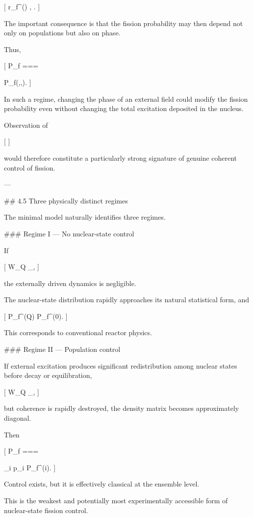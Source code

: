 [
r_f^{()}
,
.
]

The important consequence is that the fission probability may then depend not only on populations but also on phase.

Thus,

[
P_f
===

P_f(\Omega,\Delta,\phi).
]

In such a regime, changing the phase of an external field could modify the fission probability even without changing the total excitation deposited in the nucleus.

Observation of

[
]

would therefore constitute a particularly strong signature of genuine coherent control of fission.

---

## 4.5 Three physically distinct regimes

The minimal model naturally identifies three regimes.

### Regime I — No nuclear-state control

If

[
W_Q
\ll
\Gamma_{},
]

the externally driven dynamics is negligible.

The nuclear-state distribution rapidly approaches its natural statistical form, and

[
P_f^{(Q)}
\simeq
P_f^{(0)}.
]

This corresponds to conventional reactor physics.

### Regime II — Population control

If external excitation produces significant redistribution among nuclear states before decay or equilibration,

[
W_Q
\gtrsim
\Gamma_{},
]

but coherence is rapidly destroyed, the density matrix becomes approximately diagonal.

Then

[
P_f
===

\sum_i p_i P_f^{(i)}.
]

Control exists, but it is effectively classical at the ensemble level.

This is the weakest and potentially most experimentally accessible form of nuclear-state fission control.

